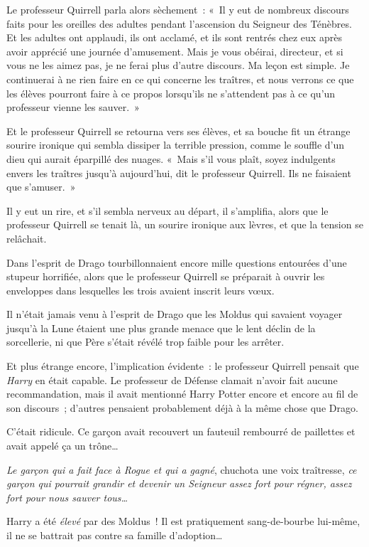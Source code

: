 Le professeur Quirrell parla alors sèchement~: «~Il y eut de nombreux discours faits pour les oreilles des adultes pendant l'ascension du Seigneur des Ténèbres. Et les adultes ont applaudi, ils ont acclamé, et ils sont rentrés chez eux après avoir apprécié une journée d'amusement. Mais je vous obéirai, directeur, et si vous ne les aimez pas, je ne ferai plus d'autre discours. Ma leçon est simple. Je continuerai à ne rien faire en ce qui concerne les traîtres, et nous verrons ce que les élèves pourront faire à ce propos lorsqu'ils ne s'attendent pas à ce qu'un professeur vienne les sauver.~»

Et le professeur Quirrell se retourna vers ses élèves, et sa bouche fit un étrange sourire ironique qui sembla dissiper la terrible pression, comme le souffle d'un dieu qui aurait éparpillé des nuages. «~Mais s'il vous plaît, soyez indulgents envers les traîtres jusqu'à aujourd'hui, dit le professeur Quirrell. Ils ne faisaient que s'amuser.~»

Il y eut un rire, et s'il sembla nerveux au départ, il s'amplifia, alors que le professeur Quirrell se tenait là, un sourire ironique aux lèvres, et que la tension se relâchait.

\later

Dans l'esprit de Drago tourbillonnaient encore mille questions entourées d'une stupeur horrifiée, alors que le professeur Quirrell se préparait à ouvrir les enveloppes dans lesquelles les trois avaient inscrit leurs vœux.

Il n'était jamais venu à l'esprit de Drago que les Moldus qui savaient voyager jusqu'à la Lune étaient une plus grande menace que le lent déclin de la sorcellerie, ni que Père s'était révélé trop faible pour les arrêter.

Et plus étrange encore, l'implication évidente~: le professeur Quirrell pensait que \emph{Harry} en était capable. Le professeur de Défense clamait n'avoir fait aucune recommandation, mais il avait mentionné Harry Potter encore et encore au fil de son discours~; d'autres pensaient probablement déjà à la même chose que Drago.

C'était ridicule. Ce garçon avait recouvert un fauteuil rembourré de paillettes et avait appelé ça un trône…

\emph{Le garçon qui a fait face à Rogue et qui a gagné}, chuchota une voix traîtresse, \emph{ce garçon qui pourrait grandir et devenir un Seigneur assez fort pour régner, assez fort pour nous sauver tous…}

Harry a été \emph{élevé} par des Moldus~! Il est pratiquement sang-de-bourbe lui-même, il ne se battrait pas contre sa famille d'adoption…

